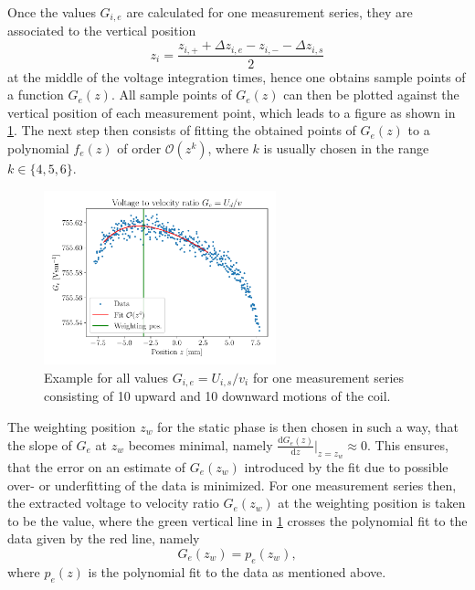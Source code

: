 \documentclass{report}
\numberwithin{tm}{section}
\begin{document}
Once the values $G_{i,e}$ are calculated for one measurement series, they are associated to the vertical position \begin{equation}
	z_i = \frac{z_{i,+} + \Delta z_{i,e} - z_{i,-} - \Delta z_{i,s}}{2}
\end{equation} at the middle of the voltage integration times, hence one obtains sample points of a function $G_{e}(z)$. All sample points of $G_{e}(z)$ can then be plotted against the vertical position of each measurement point, which leads to a figure as shown in \cref{fig:example_data_processing_uind}. The next step then consists of fitting the obtained points of $G_{e}(z)$ to a polynomial $f_e(z)$ of order $\mathcal{O}(z^k)$, where $k$ is usually chosen in the range $k \in \{4,5,6\}$. 
\begin{figure}[h]
	\centering
	\includegraphics[width=0.6\textwidth]{figures/Ge_example.pdf}
	\caption{Example for all values $G_{i,e} = U_{i,s}/v_i$ for one measurement series consisting of 10 upward and 10 downward motions of the coil.}
	\label{fig:example_data_processing_uind}
\end{figure}
The weighting position $z_w$ for the static phase is then chosen in such a way, that the slope of $G_e$ at $z_w$ becomes minimal, namely $\frac{\mathrm{d}G_e(z)}{\mathrm{d}z}\bigr|_{z=z_w} \approx 0$. This ensures, that the error on an estimate of $G_e(z_w)$ introduced by the fit due to possible over- or underfitting of the data is minimized. For one measurement series then, the extracted voltage to velocity ratio $G_e(z_w)$ at the weighting position is taken to be the value, where the green vertical line in \cref{fig:example_data_processing_uind} crosses the polynomial fit to the data given by the red line, namely \begin{equation}
	G_e(z_w) = p_e(z_w),
\end{equation} where $p_e(z)$ is the polynomial fit to the data as mentioned above.
\end{document}
